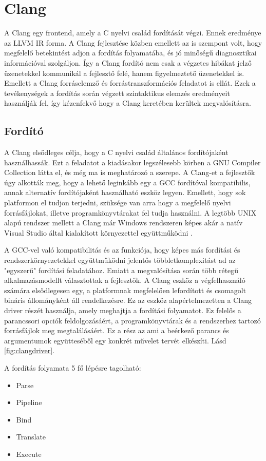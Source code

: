 \documentclass[a4paper,12pt]{report}
\begin{document}
\section{Clang}
A Clang egy frontend, amely a C nyelvi család fordítását végzi. Ennek eredménye az LLVM IR forma. A Clang fejlesztése közben emellett az is szempont volt, hogy megfelelő betekintést adjon a fordítás folyamatába, és jó minőségű diagnosztikai információval szolgáljon. Így a Clang fordító nem csak a végzetes hibákat jelző üzenetekkel kommunikál a fejlesztő felé, hanem figyelmeztető üzenetekkel is. Emellett a Clang forráselemző és forrástranszformációs feladatot is ellát. Ezek a tevékenységek a fordítás során végzett szintaktikus elemzés eredményeit használják fel, így kézenfekvő hogy a Clang keretében kerültek megvalósításra.

\subsection{Fordító}
A Clang elsődleges célja, hogy a C nyelvi család általános fordítójaként használhassák. Ezt a feladatot a kiadásakor legszélesebb körben a GNU Compiler Collection látta el, és még ma is meghatározó a szerepe. A Clang-et a fejlesztők úgy alkották meg, hogy a lehető leginkább egy a GCC fordítóval kompatibilis, annak alternatív fordítójaként használható eszköz legyen. Emellett, hogy sok platformon el tudjon terjedni, szüksége van arra hogy a megfelelő nyelvi forrásfájlokat, illetve programkönyvtárakat fel tudja használni. A legtöbb UNIX alapú rendszer mellett a Clang már Windows rendszeren képes akár a natív Visual Studio által kialakított környezettel együttműködni \cite{clangusermanual}.

A GCC-vel való kompatibilitás és az funkciója, hogy képes más fordítási és rendszerkörnyezetekkel együttműködni jelentős többletkomplexitást ad az "egyszerű" fordítási feladatához. Emiatt a megvalósítása során több rétegű alkalmazásmodellt választottak a fejlesztők. A Clang eszköz a végfelhasználó számára elsődlegesen egy, a platformnak megfelelően lefordított és csomagolt bináris állományként áll rendelkezésre. Ez az eszköz alapértelmezetten a Clang driver részét használja, amely meghajtja a fordítási folyamatot. Ez felelős a parancssori opciók feldolgozásáért, a programkönyvtárak és a rendszerhez tartozó forrásfájlok meg megtalálásáért. Ez a rész az ami a beérkező parancs és argumentumok együtteséből egy konkrét művelet tervét elkészíti. Lásd \ref{fig:clangdriver}.

A fordítás folyamata 5 fő lépésre tagolható:
\begin{itemize}
\item Parse
\item Pipeline
\item Bind
\item Translate
\item Execute
\end{itemize}
\end{document}
